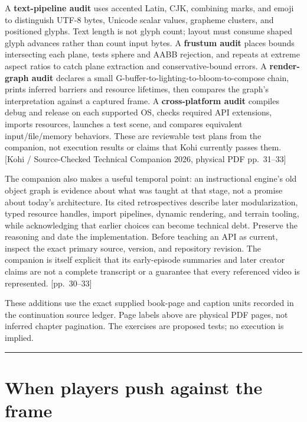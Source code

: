 A \textbf{text-pipeline audit} uses accented Latin, CJK, combining marks, and emoji to distinguish UTF-8 bytes, Unicode scalar values, grapheme clusters, and positioned glyphs. Text length is not glyph count; layout must consume shaped glyph advances rather than count input bytes. A \textbf{frustum audit} places bounds intersecting each plane, tests sphere and AABB rejection, and repeats at extreme aspect ratios to catch plane extraction and conservative-bound errors. A \textbf{render-graph audit} declares a small G-buffer-to-lighting-to-bloom-to-compose chain, prints inferred barriers and resource lifetimes, then compares the graph's interpretation against a captured frame. A \textbf{cross-platform audit} compiles debug and release on each supported OS, checks required API extensions, imports resources, launches a test scene, and compares equivalent input/file/memory behaviors. These are reviewable test plans from the companion, not execution results or claims that Kohi currently passes them. {[}Kohi / Source-Checked Technical Companion 2026, physical PDF pp.~31--33{]}

The companion also makes a useful temporal point: an instructional engine's old object graph is evidence about what was taught at that stage, not a promise about today's architecture. Its cited retrospectives describe later modularization, typed resource handles, import pipelines, dynamic rendering, and terrain tooling, while acknowledging that earlier choices can become technical debt. Preserve the reasoning and date the implementation. Before teaching an API as current, inspect the exact primary source, version, and repository revision. The companion is itself explicit that its early-episode summaries and later creator claims are not a complete transcript or a guarantee that every referenced video is represented. {[}pp.~30--33{]}

These additions use the exact supplied book-page and caption units recorded in the continuation source ledger. Page labels above are physical PDF pages, not inferred chapter pagination. The exercises are proposed tests; no execution is implied.

\begin{center}\rule{0.5\linewidth}{0.5pt}\end{center}

\section{When players push against the frame}\label{06-engine-ii-ch046-when-players-push-against-the-frame}

